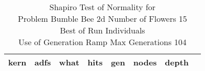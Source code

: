 \begin{table}[H]
\caption{Shapiro Test of Normality for \\ Problem  Bumble Bee 2d  Number of Flowers 15\\Best of Run Individuals \\ Use of Generation Ramp  Max Generations 104\\}
\begin{center}
\scalebox{0.8} %
{
\begin{tabular}{lrrrrrrr}
\hline
kern & adfs & what & hits & gen & nodes & depth \\
\hline


\end{tabular}
}
\end{center}
\end{table}

